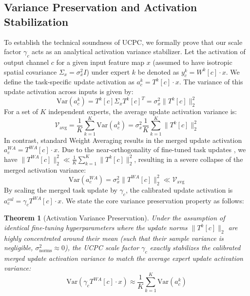 \documentclass{article}
\theoremstyle{plain}
\newtheorem{theorem}{Theorem}[section]
\theoremstyle{definition}
\theoremstyle{remark}
\begin{document}
\subsection{Variance Preservation and Activation Stabilization}
To establish the technical soundness of UCPC, we formally prove that our scale factor $\gamma_c$ acts as an analytical activation variance stabilizer. Let the activation of output channel $c$ for a given input feature map $x$ (assumed to have isotropic spatial covariance $\Sigma_x = \sigma_x^2 I$) under expert $k$ be denoted as $y_c^k = W^k[c] \cdot x$. 
We define the task-specific update activation as $a_c^k = T^k[c] \cdot x$. The variance of this update activation across inputs is given by:
\begin{equation}
  \text{Var}(a_c^k) = T^k[c] \Sigma_x T^k[c]^T = \sigma_x^2 \|T^k[c]\|_2^2
\end{equation}
For a set of $K$ independent experts, the average update activation variance is:
\begin{equation}
  \mathcal{V}_{\text{avg}} = \frac{1}{K} \sum_{k=1}^K \text{Var}(a_c^k) = \sigma_x^2 \frac{1}{K} \sum_{k=1}^K \|T^k[c]\|_2^2
\end{equation}
In contrast, standard Weight Averaging results in the merged update activation $a_c^{WA} = T^{WA}[c] \cdot x$. Due to the near-orthogonality of fine-tuned task updates \cite{choshen22}, we have $\|T^{WA}[c]\|_2^2 \ll \frac{1}{K}\sum_{k=1}^K \|T^k[c]\|_2^2$, resulting in a severe collapse of the merged activation variance:
\begin{equation}
  \text{Var}(a_c^{WA}) = \sigma_x^2 \|T^{WA}[c]\|_2^2 \ll \mathcal{V}_{\text{avg}}
\end{equation}
By scaling the merged task update by $\gamma_c$, the calibrated update activation is $a_c^{cal} = \gamma_c T^{WA}[c] \cdot x$. We state the core variance preservation property as follows:
\begin{theorem}[Activation Variance Preservation]
  Under the assumption of identical fine-tuning hyperparameters where the update norms $\|T^k[c]\|_2$ are highly concentrated around their mean (such that their sample variance is negligible, $\sigma_{\text{norms}}^2 \approx 0$), the UCPC scale factor $\gamma_c$ exactly stabilizes the calibrated merged update activation variance to match the average expert update activation variance:
  \begin{equation}
    \text{Var}(\gamma_c T^{WA}[c] \cdot x) \approx \frac{1}{K} \sum_{k=1}^K \text{Var}(a_c^k)
  \end{equation}
\end{theorem}
\end{document}
